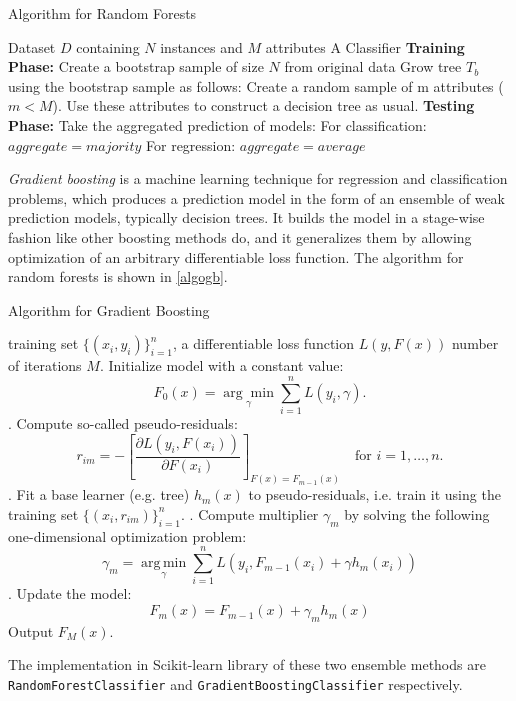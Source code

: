 \documentclass{standalone}
\begin{document}
\begin{algorithm}[H]
\caption{Algorithm for Random Forests}\label{algorf}
\begin{algorithmic}
\renewcommand{\algorithmicrequire}{\textbf{Input:}}
\renewcommand{\algorithmicensure}{\textbf{Output:}}
\newcommand{\INDSTATE}[1][1]{\STATE\hspace{#1\algorithmicindent}}
\REQUIRE Dataset $D$ containing $N$ instances and $M$ attributes
\ENSURE  A Classifier
\INDSTATE[-1] \textbf{Training Phase:}
\STATE Create a bootstrap sample of size $N$ from original data
\STATE Grow tree $T_b$ using the bootstrap sample as follows:
\INDSTATE Create a random sample of m attributes ($m < M$).
\INDSTATE Use these attributes to construct a decision tree as usual.
\ENDFOR
\INDSTATE[-1] \textbf{Testing Phase:}
\STATE Take the aggregated prediction of models:
\INDSTATE For classification: $aggregate = majority$
\INDSTATE For regression: $aggregate = average$
\ENDFOR
\end{algorithmic}
\end{algorithm}

\emph{Gradient boosting}\cite{friedman2001greedy} is a machine learning technique for regression and classification problems, which produces a prediction model in the form of an ensemble of weak prediction models, typically decision trees. It builds the model in a stage-wise fashion like other boosting methods do, and it generalizes them by allowing optimization of an arbitrary differentiable loss function.
The algorithm for random forests is shown in \cref{algogb}.

\begin{algorithm}[!ht]
\caption{Algorithm for Gradient Boosting\cite{GB:Wikipedia}}\label{algogb}
\begin{algorithmic}
\renewcommand{\algorithmicrequire}{\textbf{Input:}}
\renewcommand{\algorithmicensure}{\textbf{Algorithm:}}
\newcommand{\INDSTATE}[1][1]{\STATE\hspace{#1\algorithmicindent}}
\REQUIRE training set $\displaystyle \{(x_{i},y_{i})\}_{i=1}^{n}$, a differentiable loss function {$\displaystyle L(y,F(x))$} number of iterations $M$.
\ENSURE
\STATE Initialize model with a constant value:
\[F_0(x) = \underset{\gamma}{\arg\min} \sum_{i=1}^n L(y_i, \gamma).\]
. Compute so-called pseudo-residuals:
\[r_{im} = -\left[\frac{\partial L(y_i, F(x_i))}{\partial F(x_i)}\right]_{F(x)=F_{m-1}(x)} \quad \mbox{for } i=1,\ldots,n.\]
. Fit a base learner (e.g. tree) {$\displaystyle h_{m}(x)$} to pseudo-residuals, i.e. train it using the training set {$\displaystyle \{(x_{i},r_{im})\}_{i=1}^{n}$}.
. Compute multiplier {$\displaystyle \gamma _{m}$} by solving the following one-dimensional optimization\cite{LS:Wikipedia} problem:
\[\gamma_m = \underset{\gamma}{\operatorname{arg\,min}} \sum_{i=1}^n L\left(y_i, F_{m-1}(x_i) + \gamma h_m(x_i)\right)\]
. Update the model:
\[F_{m}(x)=F_{{m-1}}(x)+\gamma _{m}h_{m}(x)\]
\ENDFOR
\STATE Output $\displaystyle F_{M}(x)$.
\end{algorithmic}
\end{algorithm}

The implementation in Scikit-learn library of these two ensemble methods are \verb|RandomForestClassifier| and \verb|GradientBoostingClassifier| respectively.
\end{document}
